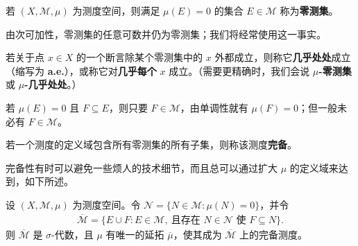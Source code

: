 \documentclass[../../main.tex]{subfiles}%
\begin{document}

\begin{definition}[零测集]\label{definition:ch01-null-almost-everywhere}
若 $(X,\mathscr{M},\mu)$ 为测度空间，则满足 $\mu(E)=0$ 的集合 $E\in\mathscr{M}$ 称为\textbf{零测集}。
\end{definition}

\begin{remark}
由次可加性，零测集的任意可数并仍为零测集；我们将经常使用这一事实。
\end{remark}

\begin{definition}[几乎处处]\label{definition:ch01-almost-everywhere}
若关于点 $x\in X$ 的一个断言除某个零测集中的 $x$ 外都成立，则称它\textbf{几乎处处}成立（缩写为 \textbf{a.e.}），或称它对\textbf{几乎每个} $x$ 成立。（需要更精确时，我们会说 \textbf{$\mu$-零测集}或 \textbf{$\mu$-几乎处处}。）
\end{definition}


若 $\mu(E)=0$ 且 $F\subseteq E$，则只要 $F\in\mathscr{M}$，由单调性就有 $\mu(F)=0$；但一般未必有 $F\in\mathscr{M}$。
\begin{definition}[完备测度]\label{definition:ch01-complete-measure-definition}
若一个测度的定义域包含所有零测集的所有子集，则称该测度\textbf{完备}。
\end{definition}
完备性有时可以避免一些烦人的技术细节，而且总可以通过扩大 $\mu$ 的定义域来达到，如下所述。

\begin{theorem}\label{theorem:ch01-measure-completion}
设 $(X,\mathscr{M},\mu)$ 为测度空间。令 $\mathscr{N}=\{N\in\mathscr{M}:\mu(N)=0\}$，并令
\begin{align*}
\overline{\mathscr{M}}=\{E\cup F:E\in\mathscr{M},\ \text{且存在 }N\in\mathscr{N}\text{ 使 }F\subseteq N\}.
\end{align*}
则 $\overline{\mathscr{M}}$ 是 $\sigma$-代数，且 $\mu$ 有唯一的延拓 $\overline{\mu}$，使其成为 $\overline{\mathscr{M}}$ 上的完备测度。
\end{theorem}
\end{document}

